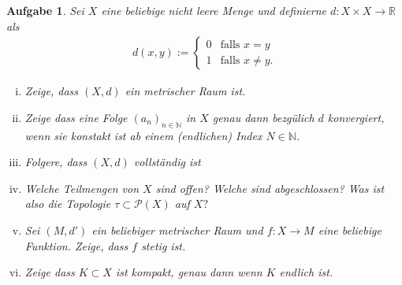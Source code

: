 \documentclass[a4paper, 20]{exam}
\newtheorem{ex}{Aufgabe}
\begin{document}
\begin{ex} Sei $X$ eine beliebige nicht leere Menge und definierne $d: X \times X \to \mathbb{R}$ als 
\begin{align*}
d(x,y):= \begin{cases} 0 & \text{falls } x=y \\ 1 & \text{falls } x \neq y. \end{cases}
\end{align*}
\begin{enumerate}[i)]
\item Zeige, dass $(X,d)$ ein metrischer Raum ist.
\item Zeige dass eine Folge $(a_n)_{n \in \mathbb{N}}$ in $X$ genau dann bezgülich $d$ konvergiert, wenn sie konstakt ist ab einem (endlichen) Index $N \in \mathbb{N}$.
\item Folgere, dass $(X,d)$ vollständig ist
\item Welche Teilmengen von $X$ sind offen? Welche sind abgeschlossen? Was ist also die Topologie $\tau \subset \mathcal{P}(X)$ auf $X?$
\item Sei $(M,d')$ ein beliebiger metrischer Raum und $f:X \to M$ eine beliebige Funktion. Zeige, dass $f$ stetig ist.
\item Zeige dass $K \subset X$ ist kompakt, genau dann wenn $K$ endlich ist. 
\end{enumerate}
\end{ex}
\end{document}
